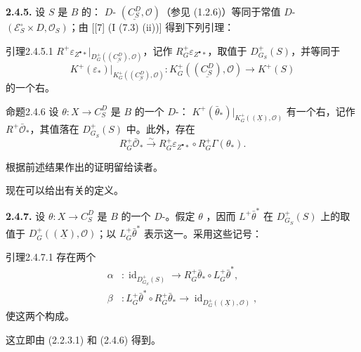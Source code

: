\textbf{2.4.5.} 设 $S$ 是 $B$ 的： $D$- $(\underline{C_S^D},\mathcal O)$（参见 (1.2.6)）等同于常值 $D$- $(\mathscr E_S^\circ\times D,\mathcal O_S)$；由 [[7] (I (7.3) (ii))] 得到下列引理：
\begin{SGAresult}{引理}{2.4.5.1}
 $R^+\varepsilon_{Z^\bullet*}|_{D^+_G((\underline{C_S^D}),\mathcal O)}$，记作 $R^+_G\varepsilon_{Z^\bullet*}$，取值于 $D^+_{G_S}(S)$，并等同于
\[
K^+(\varepsilon_*)\big|_{K^+_G((\underline{C_S^D}),\mathcal O)}:
K^+_G((\underline{C_S^D}),\mathcal O)\longrightarrow K^+(S)
\]
的一个右。
\end{SGAresult}
\begin{SGAresult}{命题}{2.4.6}
设 $\theta:X\to C_S^D$ 是 $B$ 的一个 $D$-： $K^+(\bar\theta_*)|_{K^+_G((\underline X),\mathcal O)}$ 有一个右，记作 $R^+\bar{\mathcal O}_*$，其值落在 $D^+_{G_S}(S)$ 中。此外，存在
\[
R^+_G\bar{\mathcal O}_*\xrightarrow{\sim}
R^+_G\varepsilon_{Z^\bullet*}\circ R^+_G\Gamma(\theta_*).
\]
\end{SGAresult}
根据前述结果作出的证明留给读者。

现在可以给出有关的定义。

\textbf{2.4.7.} 设 $\theta:X\to C_S^D$ 是 $B$ 的一个 $D$-。假定 $\theta$ ，因而 $L^+\bar\theta^*$ 在 $D^+_{G_S}(S)$ 上的取值于 $D^+_G((\underline X),\mathcal O)$；以 $L^+_G\bar\theta^*$ 表示这一。采用这些记号：
\begin{SGAresult}{引理}{2.4.7.1}
存在两个
\[
\begin{aligned}
\alpha &: \operatorname{id}_{D^+_{G_S}(S)}\longrightarrow R^+_G\bar\theta_*\circ L^+_G\bar\theta^*,\\
\beta &: L^+_G\bar\theta^*\circ R^+_G\bar\theta_*\longrightarrow\operatorname{id}_{D^+_G((\underline X),\mathcal O)},
\end{aligned}
\]
使这两个构成。
\end{SGAresult}
这立即由 (2.2.3.1) 和 (2.4.6) 得到。

